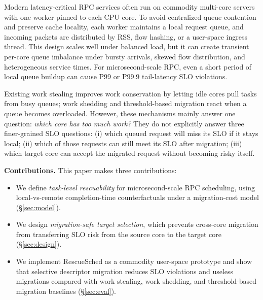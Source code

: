 Modern latency-critical RPC services often run on commodity multi-core
servers with one worker pinned to each CPU core. To avoid centralized
queue contention and preserve cache locality, each worker maintains a
local request queue, and incoming packets are distributed by RSS, flow
hashing, or a user-space ingress thread. This design scales well under
balanced load, but it can create transient per-core queue imbalance
under bursty arrivals, skewed flow distribution, and heterogeneous
service times. For microsecond-scale RPC, even a short period of local
queue buildup can cause P99 or P99.9 tail-latency SLO violations.

Existing work stealing improves work conservation by letting idle cores
pull tasks from busy queues; work shedding and threshold-based migration
react when a queue becomes overloaded. However, these mechanisms mainly
answer one question: \emph{which core has too much work?} They do not
explicitly answer three finer-grained SLO questions:
(i) which queued request will miss its SLO if it stays local;
(ii) which of those requests can still meet its SLO after migration;
(iii) which target core can accept the migrated request without becoming
risky itself.


\textbf{Contributions.} This paper makes three contributions:
\begin{itemize}
  \item We define \emph{task-level rescuability} for microsecond-scale
  RPC scheduling, using local-vs-remote completion-time counterfactuals
  under a migration-cost model (\S\ref{sec:model}).
  \item We design \emph{migration-safe target selection}, which prevents
  cross-core migration from transferring SLO risk from the source core
  to the target core (\S\ref{sec:design}).
  \item We implement RescueSched as a commodity user-space prototype and
  show that selective descriptor migration reduces SLO violations and
  useless migrations compared with work stealing, work shedding, and
  threshold-based migration baselines (\S\ref{sec:eval}).
\end{itemize}